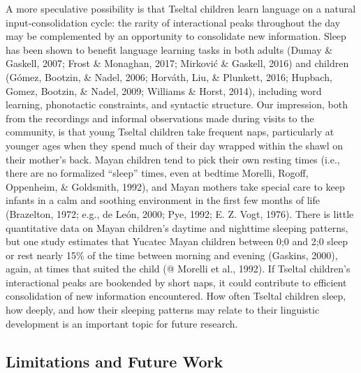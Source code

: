 \documentclass[floatsintext,man]{apa6}
\theoremstyle{definition}
\theoremstyle{definition}
\theoremstyle{definition}
\theoremstyle{remark}
\begin{document}
A more speculative possibility is that Tseltal children learn language
on a natural input-consolidation cycle: the rarity of interactional
peaks throughout the day may be complemented by an opportunity to
consolidate new information. Sleep has been shown to benefit language
learning tasks in both adults (Dumay \& Gaskell, 2007; Frost \&
Monaghan, 2017; Mirković \& Gaskell, 2016) and children (Gómez, Bootzin,
\& Nadel, 2006; Horváth, Liu, \& Plunkett, 2016; Hupbach, Gomez,
Bootzin, \& Nadel, 2009; Williams \& Horst, 2014), including word
learning, phonotactic constraints, and syntactic structure. Our
impression, both from the recordings and informal observations made
during visits to the community, is that young Tseltal children take
frequent naps, particularly at younger ages when they spend much of
their day wrapped within the shawl on their mother's back. Mayan
children tend to pick their own resting times (i.e., there are no
formalized ``sleep'' times, even at bedtime Morelli, Rogoff, Oppenheim,
\& Goldsmith, 1992), and Mayan mothers take special care to keep infants
in a calm and soothing environment in the first few months of life
(Brazelton, 1972; e.g., de León, 2000; Pye, 1992; E. Z. Vogt, 1976).
There is little quantitative data on Mayan children's daytime and
nighttime sleeping patterns, but one study estimates that Yucatec Mayan
children between 0;0 and 2;0 sleep or rest nearly 15\% of the time
between morning and evening (Gaskins, 2000), again, at times that suited
the child (@ Morelli et al., 1992). If Tseltal children's interactional
peaks are bookended by short naps, it could contribute to efficient
consolidation of new information encountered. How often Tseltal children
sleep, how deeply, and how their sleeping patterns may relate to their
linguistic development is an important topic for future research.

\subsection{Limitations and Future Work}\label{disc-limfut}
\end{document}
